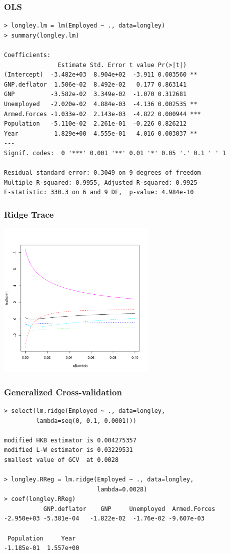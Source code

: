 \documentclass[handout]{beamer}
\begin{document}
\begin{frame}[fragile]
  \frametitle{OLS}
\begin{small}
\begin{verbatim}
> longley.lm = lm(Employed ~ ., data=longley)
> summary(longley.lm)

Coefficients:
               Estimate Std. Error t value Pr(>|t|)    
(Intercept)  -3.482e+03  8.904e+02  -3.911 0.003560 ** 
GNP.deflator  1.506e-02  8.492e-02   0.177 0.863141    
GNP          -3.582e-02  3.349e-02  -1.070 0.312681    
Unemployed   -2.020e-02  4.884e-03  -4.136 0.002535 ** 
Armed.Forces -1.033e-02  2.143e-03  -4.822 0.000944 ***
Population   -5.110e-02  2.261e-01  -0.226 0.826212    
Year          1.829e+00  4.555e-01   4.016 0.003037 ** 
---
Signif. codes:  0 '***' 0.001 '**' 0.01 '*' 0.05 '.' 0.1 ' ' 1 

Residual standard error: 0.3049 on 9 degrees of freedom
Multiple R-squared: 0.9955,	Adjusted R-squared: 0.9925 
F-statistic: 330.3 on 6 and 9 DF,  p-value: 4.984e-10 
\end{verbatim}
\end{small}
\end{frame}
\begin{frame}
  \frametitle{Ridge Trace}
  \centerline{\includegraphics[height=3in]{ridge-trace}}
\end{frame}
\begin{frame}[fragile]
\frametitle{Generalized Cross-validation}
\begin{small}
\begin{verbatim}
> select(lm.ridge(Employed ~ ., data=longley, 
         lambda=seq(0, 0.1, 0.0001)))

modified HKB estimator is 0.004275357 
modified L-W estimator is 0.03229531 
smallest value of GCV  at 0.0028 

> longley.RReg = lm.ridge(Employed ~ ., data=longley, 
                          lambda=0.0028)
> coef(longley.RReg)
           GNP.deflator    GNP     Unemployed  Armed.Forces 
-2.950e+03 -5.381e-04   -1.822e-02  -1.76e-02 -9.607e-03 

 Population     Year 
-1.185e-01  1.557e+00 
\end{verbatim}
 
\end{small}

\end{frame}
\end{document}
